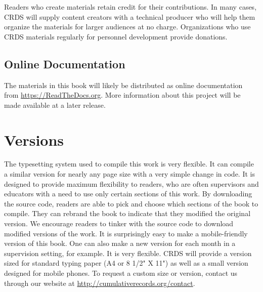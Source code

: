 Readers who create materials retain credit for their contributions. In many cases, CRDS will supply content creators with a technical producer who will help them organize the materials for larger audiences at no charge. Organizations who use CRDS materials regularly for personnel development provide donations.

\subsection{Online Documentation}
The materials in this book will likely be distributed as online documentation from \url{https://ReadTheDocs.org}. More information about this project will be made available at a later release. 

\section{Versions}
The typesetting system used to compile this work is very flexible. It can compile a similar version for nearly any page size with a very simple change in code. It is designed to provide maximum flexibility to readers, who are often supervisors and educators with a need to use only certain sections of this work. By downloading the source code, readers are able to pick and choose which sections of the book to compile. They can rebrand the book to indicate that they modified the original version. We encourage readers to tinker with the source code to download modified versions of the work. It is surprisingly easy to make a mobile-friendly version of this book. One can also make a new version for each month in a supervision setting, for example. It is very flexible. CRDS will provide a version sized for standard typing paper (A4 or 8 1/2" X 11") as well as a small version designed for mobile phones. To request a custom size or version, contact us through our website at \url{http://cumulativerecords.org/contact}.





